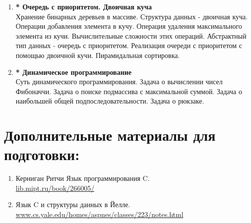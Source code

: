 \documentclass{article}
\begin{document}
\begin{enumerate}
\item \textbf{* Очередь с приоритетом. Двоичная куча}\\
Хранение бинарных деревьев в массиве. Структура данных - двоичная куча. Операции добавления элемента в кучу. Операция удаления максимального элемента из кучи. Вычислительные сложности этих операций. Абстрактный тип данных - очередь с приоритетом. Реализация очереди с приоритетом с помощью двоичной кучи. Пирамидальная сортировка.

\item \textbf{* Динамическое программирование}\\
Суть динамического программирования. Задача о вычислении чисел Фибоначчи. Задача о поиске подмассива с максимальной суммой. Задача о наибольшей общей подпоследовательности. Задача о рюкзаке. 
\fi
\end{enumerate}



\newpage
\section*{Дополнительные материалы для подготовки:}
\begin{enumerate}
\item Керниган Ритчи Язык программирования C.\\
\hspace*{16pt} \href{https://lib.mipt.ru/book/266005/}{lib.mipt.ru/book/266005/}
\item Язык C и структуры данных в Йелле.\\ \hspace*{16pt} \href{http://www.cs.yale.edu/homes/aspnes/classes/223/notes.html}{www.cs.yale.edu/homes/aspnes/classes/223/notes.html}
\end{enumerate}
\end{document}

